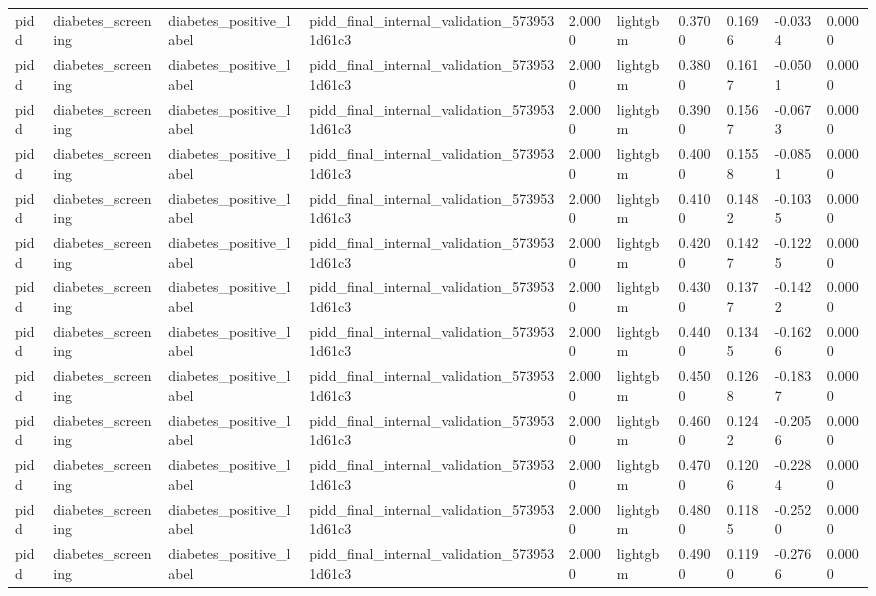 \begin{tabular}{llllllllll}
pidd & diabetes\_screening & diabetes\_positive\_label & pidd\_final\_internal\_validation\_5739531d61c3 & 2.0000 & lightgbm & 0.3700 & 0.1696 & -0.0334 & 0.0000 \\
pidd & diabetes\_screening & diabetes\_positive\_label & pidd\_final\_internal\_validation\_5739531d61c3 & 2.0000 & lightgbm & 0.3800 & 0.1617 & -0.0501 & 0.0000 \\
pidd & diabetes\_screening & diabetes\_positive\_label & pidd\_final\_internal\_validation\_5739531d61c3 & 2.0000 & lightgbm & 0.3900 & 0.1567 & -0.0673 & 0.0000 \\
pidd & diabetes\_screening & diabetes\_positive\_label & pidd\_final\_internal\_validation\_5739531d61c3 & 2.0000 & lightgbm & 0.4000 & 0.1558 & -0.0851 & 0.0000 \\
pidd & diabetes\_screening & diabetes\_positive\_label & pidd\_final\_internal\_validation\_5739531d61c3 & 2.0000 & lightgbm & 0.4100 & 0.1482 & -0.1035 & 0.0000 \\
pidd & diabetes\_screening & diabetes\_positive\_label & pidd\_final\_internal\_validation\_5739531d61c3 & 2.0000 & lightgbm & 0.4200 & 0.1427 & -0.1225 & 0.0000 \\
pidd & diabetes\_screening & diabetes\_positive\_label & pidd\_final\_internal\_validation\_5739531d61c3 & 2.0000 & lightgbm & 0.4300 & 0.1377 & -0.1422 & 0.0000 \\
pidd & diabetes\_screening & diabetes\_positive\_label & pidd\_final\_internal\_validation\_5739531d61c3 & 2.0000 & lightgbm & 0.4400 & 0.1345 & -0.1626 & 0.0000 \\
pidd & diabetes\_screening & diabetes\_positive\_label & pidd\_final\_internal\_validation\_5739531d61c3 & 2.0000 & lightgbm & 0.4500 & 0.1268 & -0.1837 & 0.0000 \\
pidd & diabetes\_screening & diabetes\_positive\_label & pidd\_final\_internal\_validation\_5739531d61c3 & 2.0000 & lightgbm & 0.4600 & 0.1242 & -0.2056 & 0.0000 \\
pidd & diabetes\_screening & diabetes\_positive\_label & pidd\_final\_internal\_validation\_5739531d61c3 & 2.0000 & lightgbm & 0.4700 & 0.1206 & -0.2284 & 0.0000 \\
pidd & diabetes\_screening & diabetes\_positive\_label & pidd\_final\_internal\_validation\_5739531d61c3 & 2.0000 & lightgbm & 0.4800 & 0.1185 & -0.2520 & 0.0000 \\
pidd & diabetes\_screening & diabetes\_positive\_label & pidd\_final\_internal\_validation\_5739531d61c3 & 2.0000 & lightgbm & 0.4900 & 0.1190 & -0.2766 & 0.0000 \\

\end{tabular}
